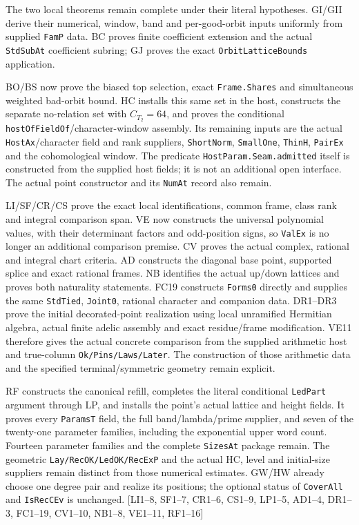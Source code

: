 \documentclass[11pt,a4paper]{article}
\numberwithin{equation}{section}
\theoremstyle{remark}\newtheorem{remark}[theorem]{Remark}
\begin{document}
\begin{description}[style=nextline]
\item[Construct one family realizing all the selected data.]
The two local theorems remain complete under their literal hypotheses.
GI/GII derive their numerical, window, band and per-good-orbit inputs
uniformly from supplied \texttt{FamP} data. BC proves finite coefficient
extension and the actual \texttt{StdSubAt} coefficient subring; GJ proves
the exact \texttt{OrbitLatticeBounds} application.

BO/BS now prove the biased top selection, exact \texttt{Frame.Shares}
and simultaneous weighted bad-orbit bound. HC installs this same set
in the host, constructs the separate no-relation set with $C_{T_2}=64$,
and proves the conditional \texttt{hostOfFieldOf}/character-window
assembly. Its remaining inputs are the actual \texttt{HostAx}/character
field and rank suppliers, \texttt{ShortNorm}, \texttt{SmallOne},
\texttt{ThinH}, \texttt{PairEx} and the cohomological window.
The predicate \texttt{HostParam.Seam.admitted} itself is constructed
from the supplied host fields; it is not an additional open interface.
The actual point constructor and its \texttt{NumAt} record also remain.

LI/SF/CR/CS prove the exact local identifications, common frame,
class rank and integral comparison span. VE now constructs the universal
polynomial values, with their determinant factors and odd-position signs,
so \texttt{ValEx} is no longer an additional comparison premise.
CV proves the actual complex, rational and integral chart criteria.
AD constructs the diagonal base point, supported splice and exact rational
frames. NB identifies the actual up/down lattices and proves both naturality
statements. FC19 constructs \texttt{Forms0} directly and supplies the
same \texttt{StdTied}, \texttt{Joint0}, rational character and companion
data. DR1--DR3 prove the initial decorated-point realization using local
unramified Hermitian algebra, actual finite adelic assembly and exact
residue/frame modification. VE11 therefore gives the actual concrete
comparison from the supplied arithmetic host and true-column
\texttt{Ok/Pins/Laws/Later}. The construction of those arithmetic
data and the specified terminal/symmetric geometry remain explicit.

RF constructs the canonical refill, completes the literal conditional
\texttt{LedPart} argument through LP, and installs the point's actual
lattice and height fields. It proves every \texttt{ParamsT} field,
the full band/lambda/prime supplier, and seven of the twenty-one
parameter families, including the exponential upper word count.
Fourteen parameter families and the complete \texttt{SizesAt} package
remain. The geometric \texttt{Lay/RecOK/LedOK/RecExP} and the actual
HC, level and initial-size suppliers remain distinct from those numerical
estimates. GW/HW already choose one degree pair and realize its positions;
the optional status of \texttt{CoverAll} and \texttt{IsRecCEv} is unchanged.
\textsf{[LI1--8, SF1--7, CR1--6, CS1--9, LP1--5, AD1--4,
DR1--3, FC1--19, CV1--10, NB1--8, VE1--11, RF1--16]}



\end{description}
\end{document}
